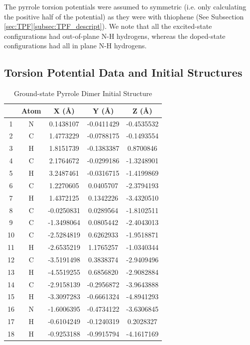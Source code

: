 The pyrrole torsion potentials were assumed to symmetric (i.e. only calculating the positive half of the potential) as they were with thiophene (See Subsection \ref{sec:TPF}\ref{subsec:TPF_descript}). We note that all the excited-state configurations had out-of-plane N-H hydrogens, whereas the doped-state configurations had all in plane N-H hydrogens.

\clearpage

\subsection{Torsion Potential Data and Initial Structures}
\begin{table}[hbt!]\centering
\caption{Ground-state Pyrrole Dimer Initial Structure}
\renewcommand{\arraystretch}{1.5}
\begin{threeparttable}
\begin{tabular}{ccccc}\toprule
{} & {Atom} & {X (\AA)} & {Y (\AA)} & {Z (\AA)} \\ \midrule
    1  & N &  0.1438107 & -0.0411429 & -0.4535532\\
    2  & C &  1.4773229 & -0.0788175 & -0.1493554\\
    3  & H &  1.8151739 & -0.1383387 &  0.8700846\\
    4  & C &  2.1764672 & -0.0299186 & -1.3248901\\
    5  & H &  3.2487461 & -0.0316715 & -1.4199869\\
    6  & C &  1.2270605 &  0.0405707 & -2.3794193\\ \midrule
    7  & H &  1.4372125 &  0.1342226 & -3.4320510\\
    8  & C & -0.0250831 &  0.0289564 & -1.8102511\\
    9  & C & -1.3498064 &  0.0805442 & -2.4043013\\
    10 & C & -2.5284819 &  0.6262933 & -1.9518871\\
    11 & H & -2.6535219 &  1.1765257 & -1.0340344\\
    12 & C & -3.5191498 &  0.3838374 & -2.9409496\\ \midrule
    13 & H & -4.5519255 &  0.6856820 & -2.9082884\\
    14 & C & -2.9158139 & -0.2956872 & -3.9643888\\
    15 & H & -3.3097283 & -0.6661324 & -4.8941293\\
    16 & N & -1.6006395 & -0.4734122 & -3.6306845\\
    17 & H & -0.6104249 & -0.1240319 &  0.2028327\\
    18 & H & -0.9253188 & -0.9915794 & -4.1617169\\ \bottomrule
\end{tabular}
\begin{tablenotes}
\item
\end{tablenotes}
\end{threeparttable}
\end{table}

